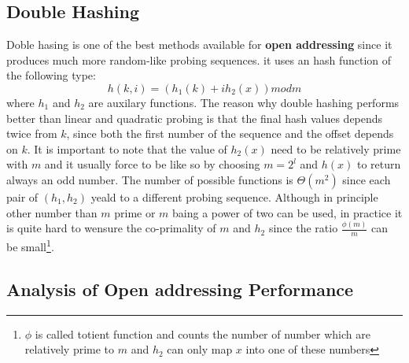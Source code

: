 \subsection{Double Hashing}
Doble hasing is one of the best methods available for \textbf{open addressing} since it produces much more random-like probing sequences. it uses an hash function of the following type:
\[
h(k,i) =(h_1(k)+ih_2(x)) mod m
\]
where $h_1$ and $h_2$ are auxilary functions. The reason why double hashing performs better than linear and quadratic probing is that the final hash values depends twice from $k$, since both the first number of the sequence and the offset depends on $k$.
It is important to note  that the value of $h_2(x)$ need to be relatively prime with $m$ and it usually force to be like so by choosing $m=2^l$ and $h(x)$ to return always an odd number.
The number of possible functions is $\Theta(m^2)$ since each pair of $(h_1,h_2)$ yeald to a different probing sequence.
Although in principle other number than $m$ prime or $m$ baing a power of two can be used, in practice it is quite hard to wensure the co-primality of $m$ and $h_2$ since the ratio $\frac{\phi(m)}{m}$ can be small\footnote{$\phi$ is called totient function and counts the number of number which are relatively prime to $m$ and $h_2$ can only map $x$ into one of these numbers}.

\subsection{Analysis of Open addressing Performance}